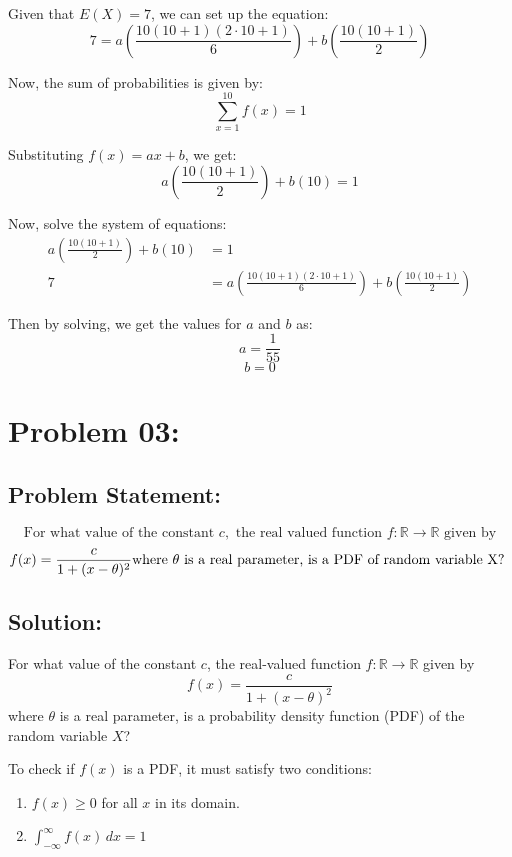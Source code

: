 \documentclass{article}
\theoremstyle{definition}
\begin{document}
Given that $E(X) = 7$, we can set up the equation:
\[ 7 = a\left(\frac{10(10+1)(2 \cdot 10+1)}{6}\right) + b\left(\frac{10(10+1)}{2}\right) \]


Now, the sum of probabilities is given by:
\[ \sum_{x=1}^{10} f(x) = 1 \]

Substituting $f(x) = ax + b$, we get:
\[ a\left(\frac{10(10+1)}{2}\right) + b(10) = 1 \]

Now, solve the system of equations:
\[
\begin{align*}
a\left(\frac{10(10+1)}{2}\right) + b(10) &= 1 \\
7 &= a\left(\frac{10(10+1)(2 \cdot 10+1)}{6}\right) + b\left(\frac{10(10+1)}{2}\right)
\end{align*}
\]

Then by solving, we get the  values for $a$ and $b$ as:
\[ a = \frac{1}{55} \]
\[ b = 0\]

\section{Problem 03:}



\begin{mdframed}[style = MyFrame]

\subsection{Problem Statement:}
\[
\text{For what value of the constant } c, \text{ the real valued function } f : \mathbb{R} \rightarrow \mathbb{R} \text{ given by}\]
\[
f(x) = \frac{c}{1 + (x - \theta)^2}\\
\text{where } \theta \text{ is a real parameter, is a PDF of random variable  X? }
\]


\end{mdframed}
\subsection{Solution:}
For what value of the constant $c$, the real-valued function $f : \mathbb{R} \rightarrow \mathbb{R}$ given by
\[
f(x) = \frac{c}{1 + (x - \theta)^2}
\]
where $\theta$ is a real parameter, is a probability density function (PDF) of the random variable $X$?

To check if $f(x)$ is a PDF, it must satisfy two conditions:
\begin{enumerate}
  \item $f(x) \geq 0$ for all $x$ in its domain.
  \item $\int_{-\infty}^{\infty} f(x) \,dx = 1$
\end{enumerate}
\end{document}
